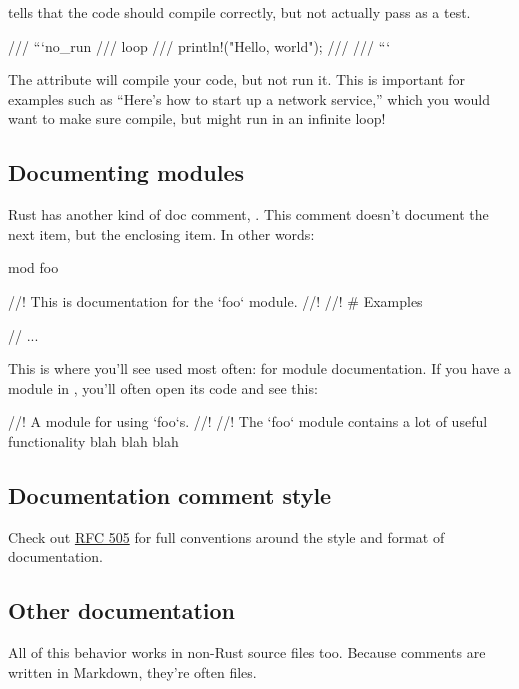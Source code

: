  tells  that the code should compile correctly, but not actually pass as a test.

\begin{rustc}
/// ```no_run
/// loop {
///     println!("Hello, world");
/// }
/// ```
\end{rustc}

The  attribute will compile your code, but not run it. This is important for examples such as \enquote{Here's how to 
start up a network service,} which you would want to make sure compile, but might run in an infinite loop!

\subsection*{Documenting modules}

Rust has another kind of doc comment, \code{//!}. This comment doesn't document the next item, but the enclosing item. In other words:

\begin{rustc}
mod foo {
    //! This is documentation for the `foo` module.
    //!
    //! # Examples

    // ...
}
\end{rustc}

This is where you'll see \code{//!} used most often: for module documentation. If you have a module in , you'll often 
open its code and see this:

\begin{rustc}
//! A module for using `foo`s.
//!
//! The `foo` module contains a lot of useful functionality blah blah blah
\end{rustc}

\subsection*{Documentation comment style}

Check out \href{https://github.com/rust-lang/rfcs/blob/master/text/0505-api-comment-conventions.md}{RFC 505} for full conventions 
around the style and format of documentation.

\subsection*{Other documentation}

All of this behavior works in non-Rust source files too. Because comments are written in Markdown, they're often  files.

